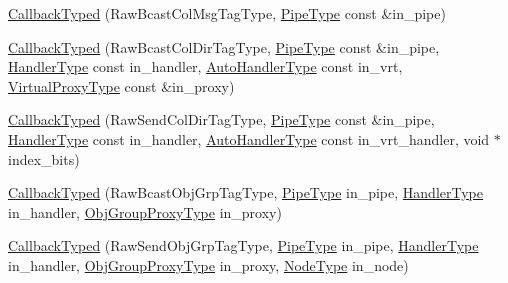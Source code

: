 \begin{DoxyCompactItemize}
\item 
\hyperlink{structvt_1_1pipe_1_1callback_1_1cbunion_1_1_callback_typed_a36657b73ab1715cf79691e7a2ddb83e1}{Callback\+Typed} (Raw\+Bcast\+Col\+Msg\+Tag\+Type, \hyperlink{namespacevt_ac9852acda74d1896f48f406cd72c7bd3}{Pipe\+Type} const \&in\+\_\+pipe)
\item 
\hyperlink{structvt_1_1pipe_1_1callback_1_1cbunion_1_1_callback_typed_a53449646d77256c5ecb4deba498cac60}{Callback\+Typed} (Raw\+Bcast\+Col\+Dir\+Tag\+Type, \hyperlink{namespacevt_ac9852acda74d1896f48f406cd72c7bd3}{Pipe\+Type} const \&in\+\_\+pipe, \hyperlink{namespacevt_af64846b57dfcaf104da3ef6967917573}{Handler\+Type} const in\+\_\+handler, \hyperlink{structvt_1_1pipe_1_1callback_1_1cbunion_1_1_callback_raw_base_single_a734a9c83099de5bc1cd85f9da8dba7bb}{Auto\+Handler\+Type} const in\+\_\+vrt, \hyperlink{namespacevt_a1b417dd5d684f045bb58a0ede70045ac}{Virtual\+Proxy\+Type} const \&in\+\_\+proxy)
\item 
\hyperlink{structvt_1_1pipe_1_1callback_1_1cbunion_1_1_callback_typed_a24eedca0271b07c996a46fd79830f22a}{Callback\+Typed} (Raw\+Send\+Col\+Dir\+Tag\+Type, \hyperlink{namespacevt_ac9852acda74d1896f48f406cd72c7bd3}{Pipe\+Type} const \&in\+\_\+pipe, \hyperlink{namespacevt_af64846b57dfcaf104da3ef6967917573}{Handler\+Type} const in\+\_\+handler, \hyperlink{structvt_1_1pipe_1_1callback_1_1cbunion_1_1_callback_raw_base_single_a734a9c83099de5bc1cd85f9da8dba7bb}{Auto\+Handler\+Type} const in\+\_\+vrt\+\_\+handler, void $\ast$index\+\_\+bits)
\item 
\hyperlink{structvt_1_1pipe_1_1callback_1_1cbunion_1_1_callback_typed_a5ac854c689dea58e9063903a460d8f9d}{Callback\+Typed} (Raw\+Bcast\+Obj\+Grp\+Tag\+Type, \hyperlink{namespacevt_ac9852acda74d1896f48f406cd72c7bd3}{Pipe\+Type} in\+\_\+pipe, \hyperlink{namespacevt_af64846b57dfcaf104da3ef6967917573}{Handler\+Type} in\+\_\+handler, \hyperlink{namespacevt_ad7cae989df485fccca57f0792a880a8e}{Obj\+Group\+Proxy\+Type} in\+\_\+proxy)
\item 
\hyperlink{structvt_1_1pipe_1_1callback_1_1cbunion_1_1_callback_typed_aa4dab73febea8b4e76bf20881fb9993d}{Callback\+Typed} (Raw\+Send\+Obj\+Grp\+Tag\+Type, \hyperlink{namespacevt_ac9852acda74d1896f48f406cd72c7bd3}{Pipe\+Type} in\+\_\+pipe, \hyperlink{namespacevt_af64846b57dfcaf104da3ef6967917573}{Handler\+Type} in\+\_\+handler, \hyperlink{namespacevt_ad7cae989df485fccca57f0792a880a8e}{Obj\+Group\+Proxy\+Type} in\+\_\+proxy, \hyperlink{namespacevt_a866da9d0efc19c0a1ce79e9e492f47e2}{Node\+Type} in\+\_\+node)
\item 

\end{DoxyCompactItemize}
